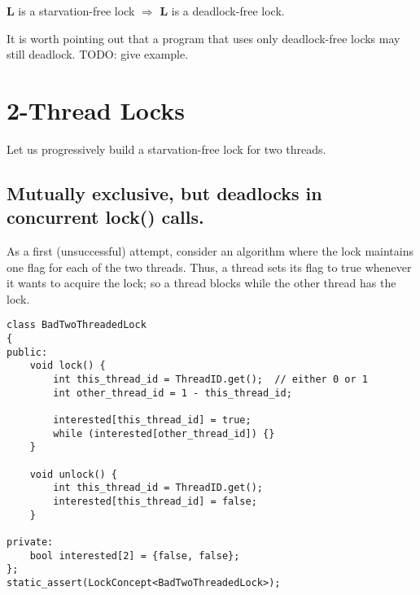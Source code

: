 \begin{corollary}\label{starvation_free_implies_deadlock_free}
\textbf{L} is a starvation-free lock $\Rightarrow$ \textbf{L} is a deadlock-free lock.
\end{corollary}

It is worth pointing out that a program that uses only deadlock-free locks may still deadlock. TODO: give example.

\section{2-Thread Locks}
Let us progressively build a starvation-free lock for two threads.

\subsection{Mutually exclusive, but deadlocks in concurrent lock() calls.}
As a first (unsuccessful) attempt, consider an algorithm where the lock maintains one flag for each of the two threads. Thus, a thread sets its flag to true whenever it wants to acquire the lock; so a thread blocks while the other thread has the lock.


\makebox[\linewidth]{\rule{17cm}{0.4pt}}
{\centering
\begin{verbatim}
class BadTwoThreadedLock
{
public:
    void lock() {
        int this_thread_id = ThreadID.get();  // either 0 or 1
        int other_thread_id = 1 - this_thread_id;

        interested[this_thread_id] = true;
        while (interested[other_thread_id]) {}
    }

    void unlock() {
        int this_thread_id = ThreadID.get();
        interested[this_thread_id] = false;
    }

private:
    bool interested[2] = {false, false};    
};
static_assert(LockConcept<BadTwoThreadedLock>);
\end{verbatim}

}
\makebox[\linewidth]{\rule{17cm}{0.4pt}}

